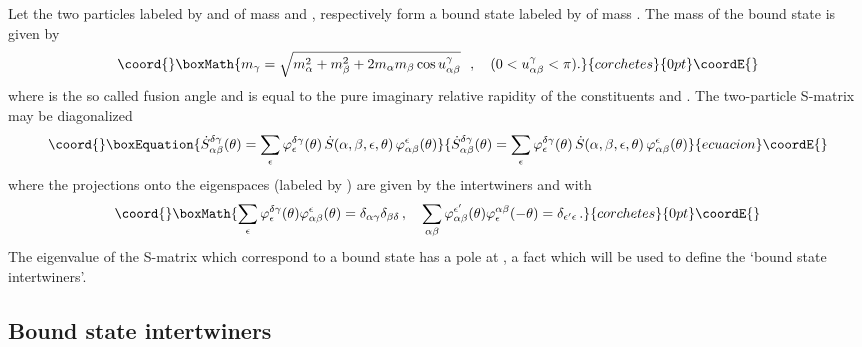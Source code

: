 \documentclass[a4paper,a4paper]{article}
\begin{document}
Let the two particles labeled by \myHighlight{$\alpha $}\coordHE{} and \myHighlight{$\beta $}\coordHE{} of mass \coordHE{}
and \coordHE{}, respectively form a bound state labeled by \myHighlight{$\gamma $}\coordHE{} of
mass \coordHE{}. The mass of the bound state \myHighlight{$\gamma $}\coordHE{} is given by 
\[\coord{}\boxMath{
m_{\gamma }=\sqrt{m_{\alpha }^{2}+m_{\beta }^{2}+2m_{\alpha }m_{\beta }\cos
u_{\alpha \beta }^{\gamma }}~~,~~~(0<u_{\alpha \beta }^{\gamma }<\pi ). 
}{corchetes}{0pt}\coordE{}\]
where \coordHE{} is the so called fusion angle and \coordHE{} is equal to the pure imaginary relative
rapidity of the constituents \myHighlight{$\alpha $}\coordHE{} and \myHighlight{$\beta $}\coordHE{}. The two-particle
S-matrix may be diagonalized 
\begin{equation}\coord{}\boxEquation{
\dot{S}_{\alpha \beta }^{\delta \gamma }(\theta )=\sum_{\epsilon }\varphi
_{\epsilon }^{\delta \gamma }(\theta )\,\dot{S}(\alpha ,\beta ,\epsilon
,\theta )\,\varphi _{\alpha \beta }^{\epsilon }(\theta )  \label{b1.30}
}{
\dot{S}_{\alpha \beta }^{\delta \gamma }(\theta )=\sum_{\epsilon }\varphi
_{\epsilon }^{\delta \gamma }(\theta )\,\dot{S}(\alpha ,\beta ,\epsilon
,\theta )\,\varphi _{\alpha \beta }^{\epsilon }(\theta )  }{ecuacion}\coordE{}\end{equation}
where the projections onto the eigenspaces (labeled by \myHighlight{$\epsilon $}\coordHE{}) are
given by the intertwiners \myHighlight{$\varphi _{\epsilon }^{\delta \gamma }(\theta )$}\coordHE{}
and \myHighlight{$\varphi _{\alpha \beta }^{\epsilon }(\theta )$}\coordHE{} with 
\[\coord{}\boxMath{
\sum_{\epsilon }\varphi _{\epsilon }^{\delta \gamma }(\theta )\varphi
_{\alpha \beta }^{\epsilon }(\theta )=\delta _{\alpha \gamma }\delta _{\beta
\delta }\,,\quad \sum_{\alpha \beta }\varphi _{\alpha \beta }^{\epsilon
^{\prime }}(\theta )\varphi _{\epsilon }^{\alpha \beta }(-\theta )=\delta
_{\epsilon ^{\prime }\epsilon }\,. 
}{corchetes}{0pt}\coordE{}\]
The eigenvalue of the S-matrix \coordHE{}
which correspond to a bound state \myHighlight{$(\alpha \beta )=\gamma $}\coordHE{} has a pole at \coordHE{} , a fact which will be used to define
the `bound state intertwiners'.

\subsection{Bound state intertwiners}
\end{document}
